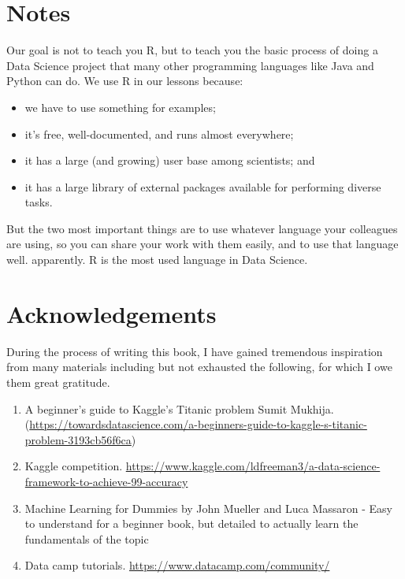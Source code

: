 \documentclass[
]{book}
\providecommand{\tightlist}{%
  \setlength{\itemsep}{0pt}\setlength{\parskip}{0pt}}
\begin{document}
\hypertarget{notes}{%
\section*{Notes}\label{notes}}


Our goal is not to teach you R, but to teach you the basic process of doing a Data Science project that many other programming languages like Java and Python can do. We use R in our lessons because:

\begin{itemize}
\tightlist
\item
  we have to use something for examples;
\item
  it's free, well-documented, and runs almost everywhere;
\item
  it has a large (and growing) user base among scientists; and
\item
  it has a large library of external packages available for performing diverse tasks.
\end{itemize}

But the two most important things are to use whatever language your colleagues are using, so you can share your work with them easily, and to use that language well. apparently. R is the most used language in Data Science.

\hypertarget{acknowledgements}{%
\section*{Acknowledgements}\label{acknowledgements}}


During the process of writing this book, I have gained tremendous inspiration from many materials including but not exhausted the following, for which I owe them great gratitude.

\begin{enumerate}
\def\labelenumi{\arabic{enumi}.}
\item
  A beginner's guide to Kaggle's Titanic problem
  Sumit Mukhija. (\url{https://towardsdatascience.com/a-beginners-guide-to-kaggle-s-titanic-problem-3193cb56f6ca})
\item
  Kaggle competition.
  \url{https://www.kaggle.com/ldfreeman3/a-data-science-framework-to-achieve-99-accuracy}
\item
  Machine Learning for Dummies by John Mueller and Luca Massaron - Easy to understand for a beginner book, but detailed to actually learn the fundamentals of the topic
\item
  Data camp tutorials.
  \url{https://www.datacamp.com/community/}
\end{enumerate}
\end{document}
